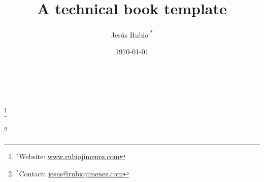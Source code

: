 \documentclass{article}
\title{A technical book template}
\author{Jes\'{u}s Rubio\textsuperscript{\dag,*}}
\date{\today}
\newcommand\blfootnote[1]{%
  \begingroup
  \renewcommand\thefootnote{}\footnote{#1}%
  \addtocounter{footnote}{-1}%
  \endgroup
}
\begin{document}
\maketitle

\blfootnote{$^{\dag}$Website: \href{https://www.rubiojimenez.com}{www.rubiojimenez.com}}
\blfootnote{$^*$Contact: \href{mailto:jesus@rubiojimenez.com}{jesus@rubiojimenez.com}}

\begin{abstract}
~
\end{abstract}

\tableofcontents

% 
% 
% 
\end{document}
